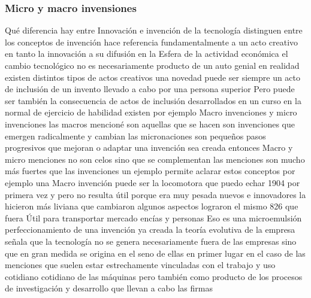 \documentclass[12pt]{book}++
\begin{document}
\subsubsection{Micro y macro invensiones}
Qué diferencia hay entre Innovación e invención de la tecnología distinguen entre los conceptos de invención hace referencia fundamentalmente a un acto creativo en tanto la innovación a su difusión en la Esfera de la actividad económica el cambio tecnológico no es necesariamente producto de un auto genial en realidad existen distintos tipos de actos creativos una novedad puede ser siempre un acto de inclusión de un invento llevado a cabo por una persona superior Pero puede ser también la consecuencia de actos de inclusión desarrollados en un curso en la normal de ejercicio de habilidad existen por ejemplo Macro invenciones y micro invenciones las macros mencioné son aquellas que se hacen son invenciones que emergen radicalmente y cambian las micronaciones son pequeños pasos progresivos que mejoran o adaptar una invención sea creada entonces Macro y micro menciones no son celos sino que se complementan las menciones son mucho más fuertes que las invenciones un ejemplo permite aclarar estos conceptos por ejemplo una Macro invención puede ser la locomotora que puedo echar 1904 por primera vez y pero no resulta útil porque era muy pesada nuevos e innovadores la hicieron más liviana que cambiaron algunos aspectos lograron el mismo 826 que fuera Útil para transportar mercado encías y personas Eso es una microemulsión perfeccionamiento de una invención ya creada la teoría evolutiva de la empresa señala que la tecnología no se genera necesariamente fuera de las empresas sino que en gran medida se origina en el seno de ellas en primer lugar en el caso de las menciones que suelen estar estrechamente vinculadas con el trabajo y uso cotidiano cotidiano de las máquinas pero también como producto de los procesos de investigación y desarrollo que llevan a cabo las firmas
\end{document}
